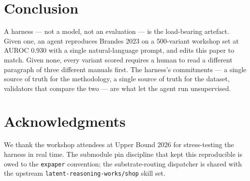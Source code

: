 \documentclass{article}
\begin{document}
\section{Conclusion}
\label{sec:conclusion}

A harness --- not a model, not an evaluation --- is the load-bearing
artefact. Given one, an agent reproduces Brandes 2023 on a 500-variant
workshop set at AUROC 0.930 with a single natural-language prompt, and
edits this paper to match. Given none, every variant scored requires a
human to read a different paragraph of three different manuals first.
The harness's commitments --- a single source of truth for the
methodology, a single source of truth for the dataset, validators that
compare the two --- are what let the agent run unsupervised.

\section*{Acknowledgments}

We thank the workshop attendees at Upper Bound 2026 for stress-testing
the harness in real time. The submodule pin discipline that kept this
reproducible is owed to the \texttt{expaper} convention; the
substrate-routing dispatcher is shared with the upstream
\texttt{latent-reasoning-works/shop} skill set.



\end{document}
